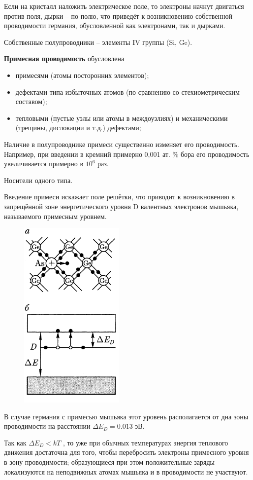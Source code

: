 \documentclass[12pt]{article}
\begin{document}
Если на кристалл наложить
электрическое поле, то электроны
начнут двигаться против поля, дырки
-- по полю, что приведёт к
возникновению собственной
проводимости германия,
обусловленной как электронами, так
и дырками.

Собственные полупроводники –
элементы IV группы (Si, Ge).

\textbf{Примесная проводимость} обусловлена
\begin{itemize}
\item примесями (атомы посторонних элементов);
\item дефектами типа избыточных атомов (по сравнению со
стехиометрическим составом);
\item тепловыми (пустые узлы или атомы в междоузлиях) и механическими
(трещины, дислокации и т.д.) дефектами;
\end{itemize}
Наличие в полупроводнике примеси существенно изменяет его проводимость.
Например, при введении в кремний примерно 0,001 ат. \% бора его
проводимость увеличивается примерно в $10^6$
раз.

Носители одного типа.

Введение примеси искажает поле решётки, что
приводит к возникновению в запрещённой зоне
энергетического уровня D валентных электронов
мышьяка, называемого примесным уровнем.

\begin{figure}[h]
	\centering
	\includegraphics[width=0.2\linewidth]{"Снимок экрана от 2024-12-23 19-20-02"}
\end{figure}


В случае германия с примесью мышьяка этот уровень
располагается от дна зоны проводимости на
расстоянии $\Delta E_D = 0.013$ эВ.

Так как  $\Delta E_D < kT$ , то уже при обычных температурах
энергия теплового движения достаточна для того,
чтобы перебросить электроны примесного уровня в
зону проводимости; образующиеся при этом
положительные заряды локализуются на неподвижных
атомах мышьяка и в проводимости не участвуют.
\end{document}
